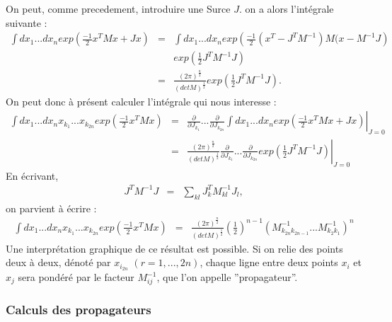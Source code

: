 \documentclass[a4paper,11pt]{article}
\theoremstyle{plain}
\theoremstyle{definition}
\theoremstyle{remark}
\numberwithin{equation}{section}
\numberwithin{equation}{subsection}
\numberwithin{figure}{section}
\begin{document}
On peut, comme precedement, introduire une Surce $J$. on a alors l'intégrale suivante :
\begin{eqnarray}
 \int dx_{1}  ...  dx_{n}   exp \left( \frac{-1}{2} x^{T} M x  + Jx \right) &=&   \int dx_{1}  ...  dx_{n} 
exp \left( \frac{-1}{2} (x^{T} - J^{T} M^{-1} ) M ( x - M^{-1} J \right) \nonumber \\  && exp \left( \frac{1}{2} J^{T} M^{-1} J \right)  \\
                                                                            &=&  
\frac{ \left(2 \pi \right)^{\frac{n}{2} }  }{ \left( det M \right)^{\frac{1}{2}} } exp \left( \frac{1}{2} J^{T} M^{-1} J \right)   .
\end{eqnarray}
On peut donc à présent calculer l'intégrale qui nous interesse :
\begin{eqnarray}
 \int dx_{1}  ...  dx_{n} x_{k_{1}}  ...  x_{k_{2n}}   exp \left( \frac{-1}{2} x^{T} M x  \right) &=&   \left.
\frac{\partial}{\partial J_{k_{1}}}   ...   \frac{\partial}{\partial J_{k_{2n}}} 
\int dx_{1}  ...  dx_{n} exp \left( \frac{-1}{2} x^{T} M x  + Jx \right)   \right |_{J=0}   \nonumber  \\
                                &=& \left.  \frac{ \left(2 \pi \right)^{\frac{n}{2} }  }{ \left( det M \right)^{\frac{1}{2}} }
\frac{\partial}{\partial J_{k_{1}}}   ...   \frac{\partial}{\partial J_{k_{2n}}} 
exp \left( \frac{1}{2} J^{T} M^{-1} J \right)   \right |_{J=0}
\end{eqnarray}
En écrivant,
\begin{eqnarray}
 J^{T} M^{-1} J &=& \sum_{kl}   J^{T}_{k}  M^{-1}_{kl}   J_{l},
\end{eqnarray}
on parvient à écrire :
\begin{eqnarray}
 \int dx_{1}  ...  dx_{n} x_{k_{1}}  ...  x_{k_{2n}}   exp \left( \frac{-1}{2} x^{T} M x  \right) &=&
\frac{ \left(2 \pi \right)^{\frac{n}{2} }  }{ \left( det M \right)^{\frac{1}{2}} } 
\left( \frac{1}{2} \right)^{n-1}
\left(  M^{-1}_{k_{2n} k_{2n-1} }  ...  M^{-1}_{k_{2} k_{1} } \right)^{n} \nonumber
\end{eqnarray}
Une interprétation graphique de ce résultat est possible. Si on relie des points deux à deux, dénoté par $x_{i_{2n}}$ $(r=1, ..., 2n)$, 
chaque ligne entre deux points $x_{i}$ et $x_{j}$ sera pondéré par le facteur $M^{-1}_{ij}$, que l'on appelle ''propagateur''.

\subsubsection{Calculs des  propagateurs}
\end{document}
